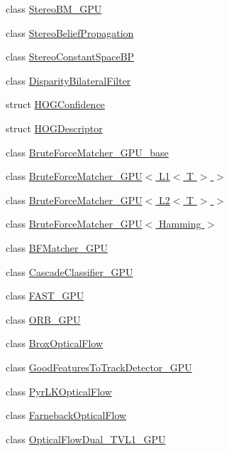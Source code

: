 \begin{DoxyCompactItemize}
class \hyperlink{classcv_1_1gpu_1_1StereoBM__GPU}{Stereo\-B\-M\-\_\-\-G\-P\-U}
\item 
class \hyperlink{classcv_1_1gpu_1_1StereoBeliefPropagation}{Stereo\-Belief\-Propagation}
\item 
class \hyperlink{classcv_1_1gpu_1_1StereoConstantSpaceBP}{Stereo\-Constant\-Space\-B\-P}
\item 
class \hyperlink{classcv_1_1gpu_1_1DisparityBilateralFilter}{Disparity\-Bilateral\-Filter}
\item 
struct \hyperlink{structcv_1_1gpu_1_1HOGConfidence}{H\-O\-G\-Confidence}
\item 
struct \hyperlink{structcv_1_1gpu_1_1HOGDescriptor}{H\-O\-G\-Descriptor}
\item 
class \hyperlink{classcv_1_1gpu_1_1BruteForceMatcher__GPU__base}{Brute\-Force\-Matcher\-\_\-\-G\-P\-U\-\_\-base}
\item 
class \hyperlink{classcv_1_1gpu_1_1BruteForceMatcher__GPU_3_01L1_3_01T_01_4_01_4}{Brute\-Force\-Matcher\-\_\-\-G\-P\-U$<$ L1$<$ T $>$ $>$}
\item 
class \hyperlink{classcv_1_1gpu_1_1BruteForceMatcher__GPU_3_01L2_3_01T_01_4_01_4}{Brute\-Force\-Matcher\-\_\-\-G\-P\-U$<$ L2$<$ T $>$ $>$}
\item 
class \hyperlink{classcv_1_1gpu_1_1BruteForceMatcher__GPU_3_01Hamming_01_4}{Brute\-Force\-Matcher\-\_\-\-G\-P\-U$<$ Hamming $>$}
\item 
class \hyperlink{classcv_1_1gpu_1_1BFMatcher__GPU}{B\-F\-Matcher\-\_\-\-G\-P\-U}
\item 
class \hyperlink{classcv_1_1gpu_1_1CascadeClassifier__GPU}{Cascade\-Classifier\-\_\-\-G\-P\-U}
\item 
class \hyperlink{classcv_1_1gpu_1_1FAST__GPU}{F\-A\-S\-T\-\_\-\-G\-P\-U}
\item 
class \hyperlink{classcv_1_1gpu_1_1ORB__GPU}{O\-R\-B\-\_\-\-G\-P\-U}
\item 
class \hyperlink{classcv_1_1gpu_1_1BroxOpticalFlow}{Brox\-Optical\-Flow}
\item 
class \hyperlink{classcv_1_1gpu_1_1GoodFeaturesToTrackDetector__GPU}{Good\-Features\-To\-Track\-Detector\-\_\-\-G\-P\-U}
\item 
class \hyperlink{classcv_1_1gpu_1_1PyrLKOpticalFlow}{Pyr\-L\-K\-Optical\-Flow}
\item 
class \hyperlink{classcv_1_1gpu_1_1FarnebackOpticalFlow}{Farneback\-Optical\-Flow}
\item 
class \hyperlink{classcv_1_1gpu_1_1OpticalFlowDual__TVL1__GPU}{Optical\-Flow\-Dual\-\_\-\-T\-V\-L1\-\_\-\-G\-P\-U}

\end{DoxyCompactItemize}
